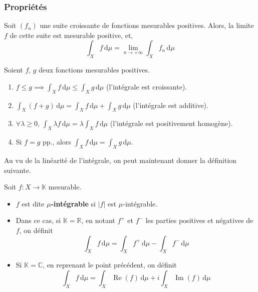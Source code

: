 	\subsubsection{Propriétés}

	\begin{theorem}
		Soit $(f_n)$ une suite croissante de fonctions mesurables positives. Alors, la limite $f$ de cette suite est mesurable positive, et,
		\[ \int_X f \, \mathrm{d}\mu = \lim_{n \rightarrow +\infty} \int_X f_n \, \mathrm{d}\mu \]
	\end{theorem}

	\begin{corollary}
		Soient $f$, $g$ deux fonctions mesurables positives.
		\begin{enumerate}[label=(\roman*)]
			\item $f \leq g \implies \int_X f \, \mathrm{d}\mu \leq \int_X g \, \mathrm{d}\mu$ (l'intégrale est croissante).
			\item $\int_X (f+g) \, \mathrm{d}\mu = \int_X f \, \mathrm{d}\mu + \int_X g \, \mathrm{d}\mu$ (l'intégrale est additive).
			\item $\forall \lambda \geq 0, \, \int_X \lambda f \, \mathrm{d}\mu = \lambda \int_X f \, \mathrm{d}\mu$ (l'intégrale est positivement homogène).
			\item Si $f = g$ pp., alors $\int_X f \, \mathrm{d}\mu = \int_X g \, \mathrm{d}\mu$.
		\end{enumerate}
	\end{corollary}

	Au vu de la linéarité de l'intégrale, on peut maintenant donner la définition suivante.


	\begin{definition}
		Soit $f : X \rightarrow \mathbb{K}$ mesurable.
		\begin{itemize}
			\item $f$ est dite \textbf{$\mu$-intégrable} si $\vert f \vert$ est $\mu$-intégrable.
			\item Dans ce cas, si $\mathbb{K} = \mathbb{R}$, en notant $f^+$ et $f^-$ les parties positives et négatives de $f$, on définit
			\[ \int_X f \, \mathrm{d}\mu = \int_X f^+ \, \mathrm{d}\mu - \int_X f^- \, \mathrm{d}\mu \]
			\item Si $\mathbb{K} = \mathbb{C}$, en reprenant le point précédent, on définit
			\[ \int_X f \, \mathrm{d}\mu = \int_X \operatorname{Re}(f) \, \mathrm{d}\mu + i \int_X \operatorname{Im}(f)  \, \mathrm{d}\mu \]
		\end{itemize}
	\end{definition}

